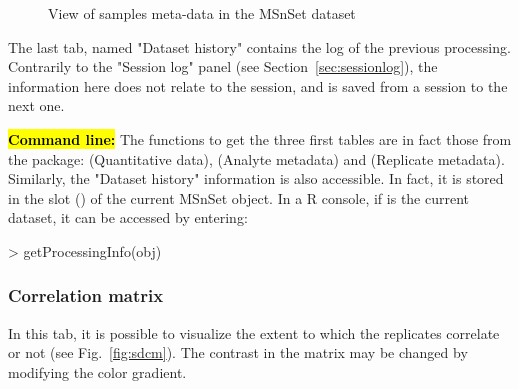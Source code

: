 \documentclass[12pt]{article}
\begin{document}
{\begin {figure}
\centering
{}
\caption{View of samples meta-data in the MSnSet dataset}\label{fig:sdqv3}
\end {figure}

The last tab, named "Dataset history" contains the log of the previous 
processing. Contrarily to the "Session log" panel (see 
Section~\ref{sec:sessionlog}), the information here does not relate to the 
session, and is saved from a session to the next one.

\hl{\bf Command line:}  The  functions to get the three first 
tables are in fact those from the  package: 
 (Quantitative data),  
(Analyte metadata) and  (Replicate metadata). 
Similarly, the "Dataset history" information is also accessible. In fact, 
it is stored in the slot () of the current MSnSet 
object. In a R console, if  is the current dataset, it can be 
accessed by entering:
\begin{Schunk}
\begin{Sinput}
> getProcessingInfo(obj)
\end{Sinput}
\end{Schunk}



\subsubsection {Correlation matrix}

{In this tab, it is possible to visualize the extent to which the replicates 
correlate or not (see Fig.~\ref{fig:sdcm}). The contrast in the matrix may be 
changed by modifying the color gradient.}

}
\end{document}
